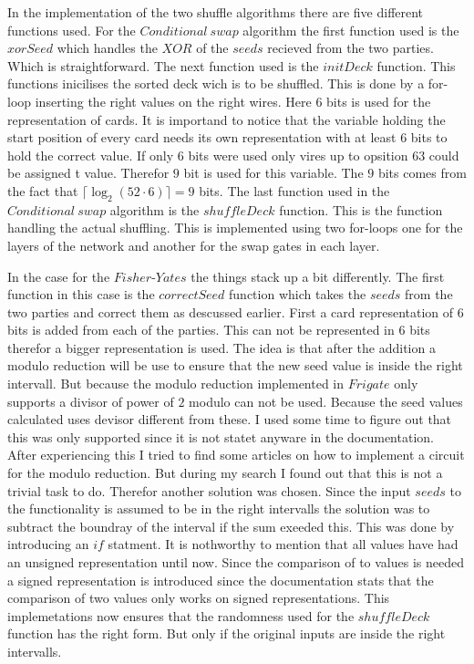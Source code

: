 \documentclass[twoside,11pt,openright]{report}
\begin{document}
In the implementation of the two shuffle algorithms there are five different functions used. For the $Conditional~swap$ algorithm the first function used is the $xorSeed$ which handles the $XOR$ of the $seeds$ recieved from the two parties. Which is straightforward. The next function used is the $initDeck$ function. This functions inicilises the sorted deck wich is to be shuffled. This is done by a for-loop inserting the right values on the right wires. Here $6$ bits is used for the representation of cards. It is importand to notice that the variable holding the start position of every card needs its own representation with at least $6$ bits to hold the correct value. If only $6$ bits were used only vires up to opsition $63$ could be assigned t value. Therefor $9$ bit is used for this variable. The $9$ bits comes from the fact that $\lceil \log_2(52\cdot 6)\rceil=9$ bits. The last function used in the $Conditional~swap$ algorithm is the $shuffleDeck$ function. This is the function handling the actual shuffling. This is implemented using two for-loops one for the layers of the network and another for the swap gates in each layer.

\bigskip

In the case for the $Fisher\text{-}Yates$ the things stack up a bit differently. The first function in this case is the $correctSeed$ function which takes the $seeds$ from the two parties and correct them as descussed earlier. First a card representation of $6$ bits is added from each of the parties. This can not be represented in $6$ bits therefor a bigger representation is used. The idea is that after the addition a modulo reduction will be use to ensure that the new seed value is inside the right intervall. But because the modulo reduction implemented in $Frigate$ only supports a divisor of power of $2$ modulo can not be used. Because the seed values calculated uses devisor different from these. I used some time to figure out that this was only supported since it is not statet anyware in the documentation. After experiencing this I tried to find some articles on how to implement a circuit for the modulo reduction. But during my search I found out that this is not a trivial task to do. Therefor another solution was chosen. Since the input $seeds$ to the functionality is assumed to be in the right intervalls the solution was to subtract the boundray of the interval if the sum exeeded this. This was done by introducing an $if$ statment. It is nothworthy to mention that all values have had an unsigned representation until now. Since the comparison of to values is needed a signed representation is introduced since the documentation stats that the comparison of two values only works on signed representations. This implemetations now ensures that the randomness used for the $shuffleDeck$ function has the right form. But only if the original inputs are inside the right intervalls.
\end{document}
